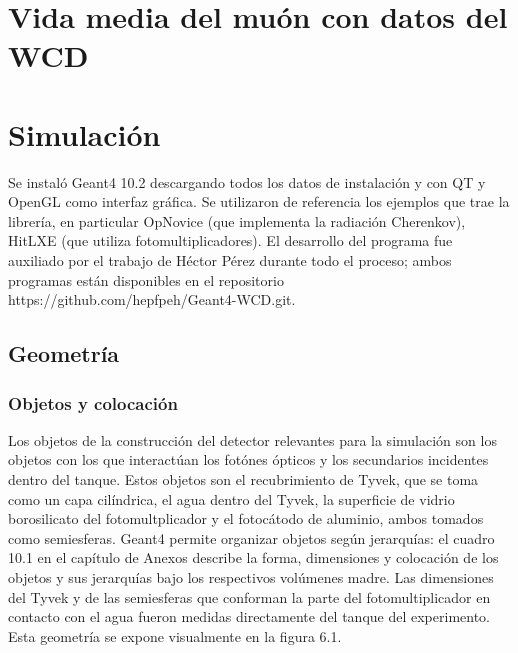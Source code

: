 \documentclass{book}
\begin{document}
\section{Vida media del mu\'on con datos del WCD}

\section{Simulaci\'on}
Se instal\'o Geant4 10.2 descargando todos los datos de instalaci\'on y con QT y OpenGL como interfaz gr\'afica. Se utilizaron de referencia los ejemplos que trae la librer\'ia, en particular OpNovice (que implementa la radiaci\'on Cherenkov), HitLXE (que utiliza fotomultiplicadores). El desarrollo del programa fue auxiliado por el trabajo de H\'ector P\'erez durante todo el proceso; ambos programas est\'an disponibles en el repositorio https://github.com/hepfpeh/Geant4-WCD.git.
\subsection{Geometr\'ia}
\subsubsection{Objetos y colocaci\'on}

Los objetos de la construcci\'on del detector relevantes para la simulaci\'on son los objetos con los que interact\'uan los fot\'ones \'opticos y los secundarios incidentes dentro del tanque. Estos objetos son el recubrimiento de Tyvek, que se toma como un capa cil\'indrica, el agua dentro del Tyvek, la superficie de vidrio borosilicato del fotomultplicador y el fotoc\'atodo de aluminio, ambos tomados como semiesferas. Geant4 permite organizar objetos seg\'un jerarqu\'ias: el cuadro 10.1 en el cap\'itulo de Anexos describe la forma, dimensiones y colocaci\'on de los objetos y sus jerarqu\'ias bajo los respectivos vol\'umenes madre. Las dimensiones del Tyvek y de las semiesferas que conforman la parte del fotomultiplicador en contacto con el agua fueron medidas directamente del tanque del experimento. Esta geometr\'ia se expone visualmente en la figura 6.1.
\end{document}
